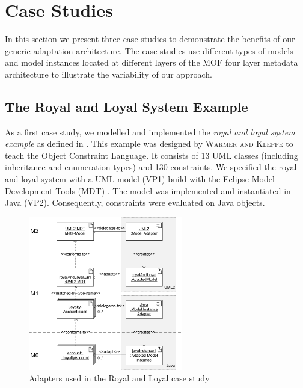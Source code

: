 \section{Case Studies}
\label{sec:caseStudies}
In this section we present three case studies to demonstrate the benefits of our
generic adaptation architecture. The case studies use different types of models
and model instances located at different layers of the MOF four layer metadata architecture
to illustrate the variability of our approach.


\subsection{The Royal and Loyal System Example}

As a first case study, we modelled and implemented the \textit{royal and loyal system example} 
as defined in \cite{warmer:ocl}. This example was designed by \textsc{Warmer
and Kleppe} to teach the Object Constraint Language. It consists of
13 UML classes (including inheritance and enumeration types) and 130 constraints. 
We specified the royal and loyal system with a UML model (VP1) build with the
Eclipse Model Development Tools (MDT) \cite{WWW:MDT}.
The model was implemented and instantiated in Java (VP2). 
Consequently, constraints were evaluated on Java objects.

\begin{figure}[!t]
	\centering
		\includegraphics[width=0.60\textwidth]{figures/casestudy01.pdf}
	\caption{
	Adapters used in the Royal and Loyal case study
	  }
	\label{fig:casestudy01}
\end{figure}


